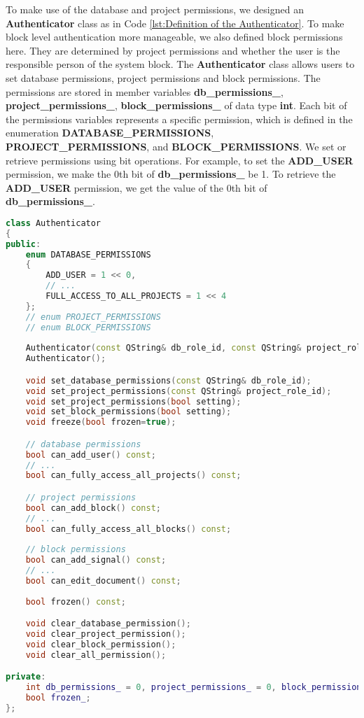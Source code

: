 To make use of the database and project permissions, we designed an \textbf{Authenticator} class as in Code \ref{lst:Definition of the Authenticator}. To make block level authentication more manageable, we also defined block permissions here. They are determined by project permissions and whether the user is the responsible person of the system block. The \textbf{Authenticator} class allows users to set database permissions, project permissions and block permissions. The permissions are stored in member variables \textbf{db\_permissions\_}, \textbf{project\_permissions\_}, \textbf{block\_permissions\_} of data type \textbf{int}. Each bit of the permissions variables represents a specific permission, which is defined in the enumeration \textbf{DATABASE\_PERMISSIONS}, \textbf{PROJECT\_PERMISSIONS}, and \textbf{BLOCK\_PERMISSIONS}. We set or retrieve permissions using bit operations. For example, to set the \textbf{ADD\_USER} permission, we make the 0th bit of \textbf{db\_permissions\_} be 1. To retrieve the \textbf{ADD\_USER} permission, we get the value of the 0th bit of \textbf{db\_permissions\_}.

\begin{lstlisting}[language=C++, caption={Definition of the Authenticator\label{lst:Definition of the Authenticator}}]
class Authenticator
{
public:
    enum DATABASE_PERMISSIONS
    {
        ADD_USER = 1 << 0,
        // ...
        FULL_ACCESS_TO_ALL_PROJECTS = 1 << 4
    };
    // enum PROJECT_PERMISSIONS
    // enum BLOCK_PERMISSIONS
    
    Authenticator(const QString& db_role_id, const QString& project_role_id);
    Authenticator();

    void set_database_permissions(const QString& db_role_id);
    void set_project_permissions(const QString& project_role_id);
    void set_project_permissions(bool setting);
    void set_block_permissions(bool setting);
    void freeze(bool frozen=true);

    // database permissions
    bool can_add_user() const;
    // ...
    bool can_fully_access_all_projects() const;

    // project permissions
    bool can_add_block() const;
    // ...
    bool can_fully_access_all_blocks() const;
    
    // block permissions
    bool can_add_signal() const;
    // ...
    bool can_edit_document() const;
    
    bool frozen() const;

    void clear_database_permission();
    void clear_project_permission();
    void clear_block_permission();
    void clear_all_permission();

private:
    int db_permissions_ = 0, project_permissions_ = 0, block_permissions_;
    bool frozen_;
};
\end{lstlisting}

